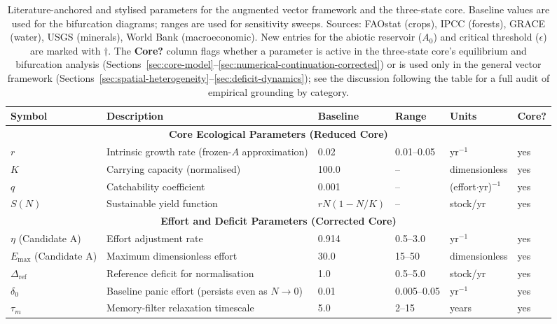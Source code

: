 \documentclass[twocolumn,10pt]{article}
\begin{document}
\begin{table}[t]
\centering
\small
\caption{Literature-anchored and stylised parameters for the augmented vector framework and the three-state core. Baseline values are used for the bifurcation diagrams; ranges are used for sensitivity sweeps. Sources: FAOstat (crops), IPCC (forests), GRACE (water), USGS (minerals), World Bank (macroeconomic). New entries for the abiotic reservoir ($A_0$) and critical threshold ($\epsilon$) are marked with $\dagger$. The \textbf{Core?} column flags whether a parameter is active in the three-state core's equilibrium and bifurcation analysis (Sections~\ref{sec:core-model}--\ref{sec:numerical-continuation-corrected}) or is used only in the general vector framework (Sections~\ref{sec:spatial-heterogeneity}--\ref{sec:deficit-dynamics}); see the discussion following the table for a full audit of empirical grounding by category.}
\label{tab:params}
\begin{tabularx}{\textwidth}{l X l l l l}
\toprule
\textbf{Symbol} & \textbf{Description} & \textbf{Baseline} & \textbf{Range} & \textbf{Units} & \textbf{Core?} \\
\midrule
\multicolumn{6}{c}{\textbf{Core Ecological Parameters (Reduced Core)}} \\
\(r\) & Intrinsic growth rate (frozen-$A$ approximation) & 0.02 & 0.01--0.05 & yr\(^{-1}\) & yes \\
\(K\) & Carrying capacity (normalised) & 100.0 & -- & dimensionless & yes \\
\(q\) & Catchability coefficient & 0.001 & -- & (effort\(\cdot\)yr)\(^{-1}\) & yes \\
\(S(N)\) & Sustainable yield function & \(rN(1-N/K)\) & -- & stock/yr & yes \\
\midrule
\multicolumn{6}{c}{\textbf{Effort and Deficit Parameters (Corrected Core)}} \\
\(\eta\) (Candidate A) & Effort adjustment rate & 0.914 & 0.5--3.0 & yr\(^{-1}\) & yes \\
\(E_{\max}\) (Candidate A) & Maximum dimensionless effort & 30.0 & 15--50 & dimensionless & yes \\
\(\Delta_{\text{ref}}\) & Reference deficit for normalisation & 1.0 & 0.5--5.0 & stock/yr & yes \\
\(\delta_0\) & Baseline panic effort (persists even as \(N \to 0\)) & 0.01 & 0.005--0.05 & yr\(^{-1}\) & yes \\
\(\tau_m\) & Memory-filter relaxation timescale & 5.0 & 2--15 & years & yes \\

\end{tabularx}
\end{table}
\end{document}
